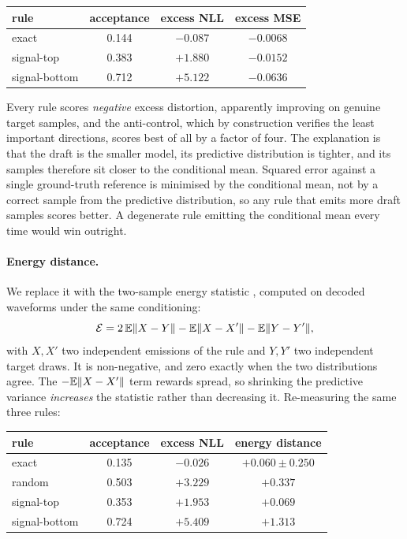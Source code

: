 \begin{center}
\small
\begin{tabular}{lccc}
\toprule
rule & acceptance & excess NLL & excess MSE \\
\midrule
exact         & 0.144 & $-0.087$ & $-0.0068$ \\
signal-top    & 0.383 & $+1.880$ & $-0.0152$ \\
signal-bottom & 0.712 & $+5.122$ & $\mathbf{-0.0636}$ \\
\bottomrule
\end{tabular}
\end{center}

Every rule scores \emph{negative} excess distortion, apparently improving on genuine target
samples, and the anti-control, which by construction verifies the least important directions, scores
best of all by a factor of four. The explanation is that the draft is the smaller model, its
predictive distribution is tighter, and its samples therefore sit closer to the conditional mean.
Squared error against a single ground-truth reference is minimised by the conditional mean, not by a
correct sample from the predictive distribution, so any rule that emits more draft samples scores
better. A degenerate rule emitting the conditional mean every time would win outright.

\paragraph{Energy distance.} We replace it with the two-sample energy statistic
\citep{szekely2013energy}, computed on decoded waveforms under the same conditioning:
\[
\mathcal{E} = 2\,\mathbb{E}\|X - Y\| - \mathbb{E}\|X - X'\| - \mathbb{E}\|Y - Y'\|,
\]
with $X, X'$ two independent emissions of the rule and $Y, Y'$ two independent target draws. It is
non-negative, and zero exactly when the two distributions agree. The $-\mathbb{E}\|X - X'\|$ term rewards
spread, so shrinking the predictive variance \emph{increases} the statistic rather than decreasing it.
Re-measuring the same three rules:

\begin{center}
\small
\begin{tabular}{lccc}
\toprule
rule & acceptance & excess NLL & energy distance \\
\midrule
exact         & 0.135 & $-0.026$ & $+0.060 \pm 0.250$ \\
random        & 0.503 & $+3.229$ & $+0.337$ \\
signal-top    & 0.353 & $+1.953$ & $+0.069$ \\
signal-bottom & 0.724 & $+5.409$ & $\mathbf{+1.313}$ \\
\bottomrule
\end{tabular}
\end{center}

